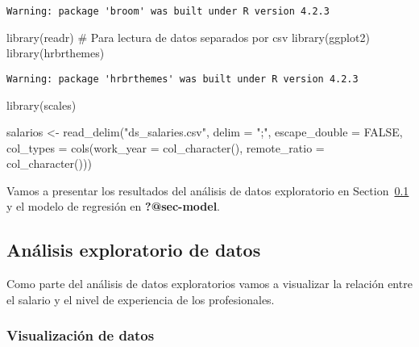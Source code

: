 \documentclass[
  letterpaper,
  DIV=11,
  numbers=noendperiod]{scrartcl}
\newenvironment{Shaded}{\begin{snugshade}}{\end{snugshade}}
\newcommand{\AttributeTok}[1]{\textcolor[rgb]{0.40,0.45,0.13}{#1}}
\newcommand{\CommentTok}[1]{\textcolor[rgb]{0.37,0.37,0.37}{#1}}
\newcommand{\ConstantTok}[1]{\textcolor[rgb]{0.56,0.35,0.01}{#1}}
\newcommand{\FunctionTok}[1]{\textcolor[rgb]{0.28,0.35,0.67}{#1}}
\newcommand{\NormalTok}[1]{\textcolor[rgb]{0.00,0.23,0.31}{#1}}
\newcommand{\OtherTok}[1]{\textcolor[rgb]{0.00,0.23,0.31}{#1}}
\newcommand{\StringTok}[1]{\textcolor[rgb]{0.13,0.47,0.30}{#1}}
\begin{document}
\begin{verbatim}
Warning: package 'broom' was built under R version 4.2.3
\end{verbatim}

\begin{Shaded}
\begin{Highlighting}[]
\FunctionTok{library}\NormalTok{(readr)      }\CommentTok{\# Para lectura de datos separados por csv}
\FunctionTok{library}\NormalTok{(ggplot2)}
\FunctionTok{library}\NormalTok{(hrbrthemes)}
\end{Highlighting}
\end{Shaded}

\begin{verbatim}
Warning: package 'hrbrthemes' was built under R version 4.2.3
\end{verbatim}

\begin{Shaded}
\begin{Highlighting}[]
\FunctionTok{library}\NormalTok{(scales)}

\NormalTok{salarios }\OtherTok{\textless{}{-}} \FunctionTok{read\_delim}\NormalTok{(}\StringTok{"ds\_salaries.csv"}\NormalTok{, }
    \AttributeTok{delim =} \StringTok{";"}\NormalTok{, }\AttributeTok{escape\_double =} \ConstantTok{FALSE}\NormalTok{, }
    \AttributeTok{col\_types =} \FunctionTok{cols}\NormalTok{(}\AttributeTok{work\_year =} \FunctionTok{col\_character}\NormalTok{(), }
                     \AttributeTok{remote\_ratio =} \FunctionTok{col\_character}\NormalTok{()))}
\end{Highlighting}
\end{Shaded}

Vamos a presentar los resultados del análisis de datos exploratorio en
Section~\ref{sec-aed} y el modelo de regresión en \textbf{?@sec-model}.

\hypertarget{sec-aed}{%
\subsection{Análisis exploratorio de datos}\label{sec-aed}}

Como parte del análisis de datos exploratorios vamos a visualizar la
relación entre el salario y el nivel de experiencia de los
profesionales.

\hypertarget{visualizaciuxf3n-de-datos}{%
\subsubsection{Visualización de datos}\label{visualizaciuxf3n-de-datos}}
\end{document}
